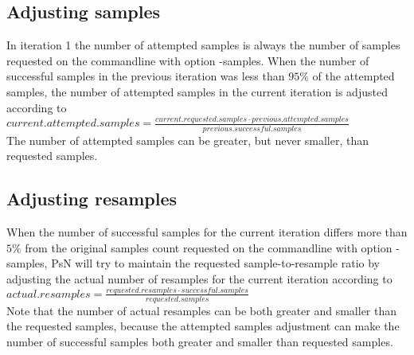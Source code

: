 \subsection{Adjusting samples}
In iteration 1 the number of attempted samples is always the number of
samples requested on the commandline with option -samples.
When the number of successful samples in the previous iteration was less than
$95\%$ of the attempted samples, the number of attempted samples in the current 
iteration is adjusted according to\\
$current.attempted.samples=\frac{current.requested.samples \cdot previous.attempted.samples}{previous.successful.samples}$\\
The number of attempted samples can be greater, but never smaller, than requested samples.

\subsection{Adjusting resamples}
When the number of successful samples for the current iteration 
differs more than $5\%$ from the original samples count requested on the commandline with option -samples,
PsN will try to maintain the requested sample-to-resample ratio by 
adjusting the actual number of resamples for the current iteration 
according to \\
$actual.resamples=\frac{requested.resamples\cdot successful.samples}{requested.samples}$\\
Note that the number of actual resamples can be both greater and smaller than the 
requested samples, because the attempted samples adjustment can make 
the number of successful samples both greater and smaller
than requested samples.




